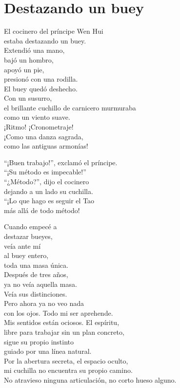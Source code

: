 \documentclass[book,b5paper,hidelinks,final]{memoir}
\begin{document}
	\chapter*{Destazando un buey}
	
	El cocinero del príncipe Wen Hui\\
	estaba destazando un buey.\\
	Extendió una mano,\\
	bajó un hombro,\\
	apoyó un pie,\\
	presionó con una rodilla.\\
	El buey quedó deshecho.\\
	Con un susurro,\\
	el brillante cuchillo de carnicero murmuraba\\
	como un viento suave.\\
	¡Ritmo! ¡Cronometraje!\\
	¡Como una danza sagrada,\\
	como las antiguas armonías!
	
	``¡Buen trabajo!'', exclamó el príncipe.\\
	``¡Su método es impecable!''\\
	``¿Método?'', dijo el cocinero\\
	dejando a un lado su cuchilla.\\
	``¡Lo que hago es seguir el Tao\\
	más allá de todo método!
	
	Cuando empecé a\\
	destazar bueyes,\\
	veía ante mí\\
	al buey entero,\\
	toda una masa única.\\
	Después de tres años,\\
	ya no veía aquella masa.\\
	Veía sus distinciones.\\
	Pero ahora ya no veo nada\\
	con los ojos. Todo mi ser aprehende.\\
	Mis sentidos están ociosos. El espíritu,\\
	libre para trabajar sin un plan concreto,\\
	sigue su propio instinto\\
	guiado por una línea natural.\\
	Por la abertura secreta, el espacio oculto,\\
	mi cuchilla no encuentra su propio camino.\\
	No atravieso ninguna articulación, no corto hueso alguno.
	
\end{document}
